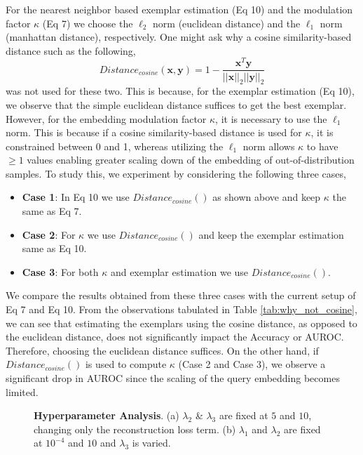 \documentclass[10pt,journal,compsoc]{IEEEtran}
\begin{document}
For the nearest neighbor based exemplar estimation (Eq 10) and the modulation factor $\kappa$ (Eq 7) we choose the $\ell_2$ norm (euclidean distance) and the $\ell_1$ norm (manhattan distance), respectively. One might ask why a cosine similarity-based distance such as the following,
\begin{equation}
    Distance_{cosine}(\mathbf{x},\mathbf{y}) = 1 - \frac{\mathbf{x}^T \mathbf{y}}{||\mathbf{x} ||_2 || \mathbf{y}||_2}
\end{equation}
 was not used for these two.  This is because, for the exemplar estimation (Eq 10), we observe that the simple euclidean distance suffices to get the best exemplar. However, for the embedding modulation factor $\kappa$, it is necessary to use the $\ell_1$ norm. This is because if a cosine similarity-based distance is used for $\kappa$, it is constrained between 0 and 1, whereas utilizing the $\ell_1$ norm allows $\kappa$ to have $\geq 1$ values enabling greater scaling down of the embedding of out-of-distribution samples. To study this, we experiment by considering the following three cases,
\begin{itemize}
    \item  \textbf{Case 1}: In Eq 10 we use $Distance_{cosine}()$ as shown above and keep $\kappa$ the same as Eq 7.

    \item \textbf{Case 2}: For $\kappa$ we use $Distance_{cosine}()$ and keep the exemplar estimation same as Eq 10.

    \item \textbf{Case 3}: For both $\kappa$ and exemplar estimation we use $Distance_{cosine}()$.
\end{itemize}
We compare the results obtained from these three cases with the current setup of Eq 7 and Eq 10. From the observations tabulated in Table \ref{tab:why_not_cosine}, we can see that estimating the exemplars using the cosine distance, as opposed to the euclidean distance, does not significantly impact the Accuracy or AUROC. Therefore, choosing the euclidean distance suffices. On the other hand, if $Distance_{cosine}()$  is used to compute $\kappa$ (Case 2 and Case 3), we observe a significant drop in AUROC since the scaling of the query embedding becomes limited.




\begin{figure}[t]
\centering
\captionsetup[subfigure]{justification=centering}
\hfill
{} 
\caption{\textbf{Hyperparameter Analysis}. (a) $\lambda_2$ \& $\lambda_3$ are fixed at $5$ and $10$,  changing only the reconstruction loss term. (b) $\lambda_1$ and $\lambda_2$ are fixed at $10^{-4}$ and $10$ and $\lambda_3$ is varied.}
\label{fig:hyper_params}
\end{figure}
\end{document}
